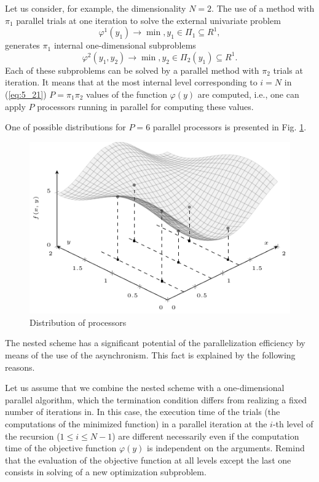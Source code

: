 Let us consider, for example, the dimensionality $N=2$. The use of a method with $\pi_1$  parallel trials at one iteration to solve the external univariate problem
\begin{displaymath}
\varphi^1(y_1)\rightarrow\min,y_1\in \Pi_1\subseteq R^1,
\end{displaymath}
generates  $\pi_1$ internal one-dimensional subproblems
\begin{displaymath}
\varphi^2(y_1,y_2)\rightarrow\min,y_2\in \Pi_2(y_1)\subseteq R^1.
\end{displaymath}
Each of these subproblems can be solved by a parallel method with  $\pi_2$  trials at iteration. It means that at the most internal level corresponding  to $i=N$  in (\ref{eq:5_21}) $P=\pi_1\pi_2$  values of the function $\varphi(y)$  are computed, i.e., one can apply $P$  processors running in parallel for computing these values. 

One of possible distributions for   $P=6$ parallel processors is presented in Fig. \ref{fig:5_6}.
\begin{figure}[t]
\centering
\includegraphics[width=0.8\linewidth]{figures/figure_5_6.pdf}
\caption{Distribution of processors}
\label{fig:5_6}    
\end{figure}

The nested scheme has a significant potential of the parallelization efficiency by means of the use of the asynchronism. This fact is explained by the following reasons.

Let us assume that we combine the nested scheme with a one-dimensional parallel algorithm, which the termination condition differs from realizing a fixed number of iterations in. In this case, the execution time of the trials (the computations of the minimized function) in a parallel iteration at the $i$-th level of the recursion ($1\leq i\leq N-1$)  are different necessarily even if the computation time of the objective function $\varphi(y)$  is independent on the arguments. Remind that the evaluation of the objective function at all levels except the last one consists in solving of a new optimization subproblem.

